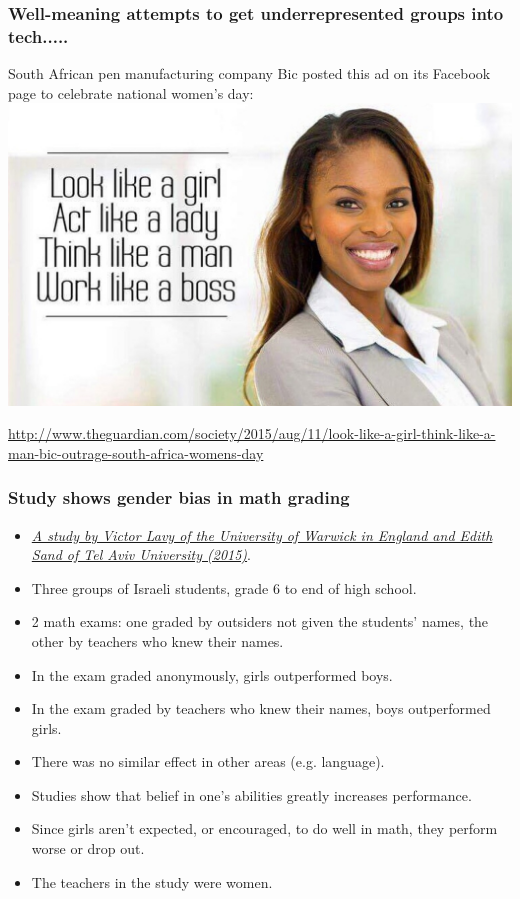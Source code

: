 \documentclass{beamer}
\begin{document}
\begin{frame}
\frametitle{Well-meaning attempts to get underrepresented groups into tech.....}
South African pen manufacturing company Bic posted this ad on its Facebook page to celebrate national women's day:
\includegraphics[scale=0.15]{thinklikeaman.jpg}

{\tiny \href{http://www.theguardian.com/society/2015/aug/11/look-like-a-girl-think-like-a-man-bic-outrage-south-africa-womens-day}{http://www.theguardian.com/society/2015/aug/11/look-like-a-girl-think-like-a-man-bic-outrage-south-africa-womens-day}}
\end{frame}

\begin{frame}
\frametitle{Study shows gender bias in math grading}
\begin{itemize}
\item {\it \href{http://www.slate.com/blogs/xx_factor/2015/02/10/teacher_bias_in_math_new_study_finds_teachers_grade_boys_more_generously.html}{A study by Victor Lavy of the University of Warwick in England and Edith Sand of Tel Aviv University (2015)}}.
\item Three groups of Israeli students, grade 6 to end of high school.
\item 2 math exams: one graded by outsiders not given the students' names, the other by teachers who knew their names.
\item In the exam graded anonymously, girls outperformed boys.
\item In  the exam graded by teachers who knew their names, boys outperformed girls.
\item There was no similar effect in other areas (e.g. language). 
\item Studies show that belief in one's abilities greatly increases performance. 
\item Since girls aren't expected, or encouraged, to do well in math, they perform worse or drop out.
\item The teachers in the study were women.
\end{itemize}
\end{frame}
\end{document}
